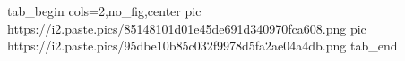  
 
 
 
 


\ifcmt
  tab_begin cols=2,no_fig,center
     pic https://i2.paste.pics/85148101d01e45de691d340970fca608.png
		 pic https://i2.paste.pics/95dbe10b85c032f9978d5fa2ae04a4db.png
  tab_end
\fi
